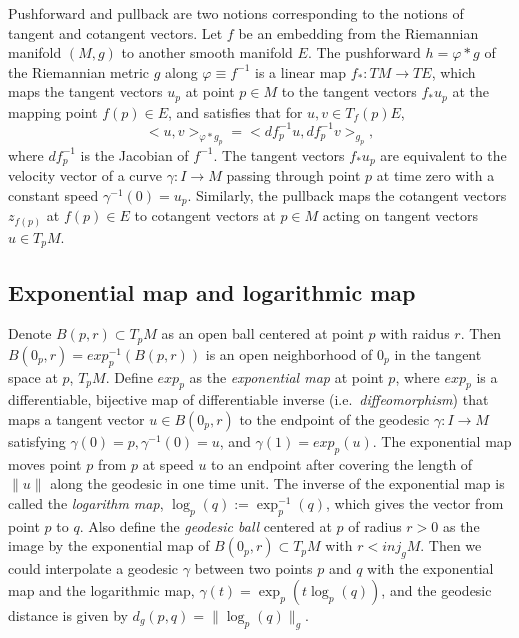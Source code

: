\documentclass[11pt,a4paper,]{article}
\begin{document}
Pushforward and pullback are two notions corresponding to the notions of tangent and cotangent vectors.
Let \(f\) be an embedding from the Riemannian manifold \((M,g)\) to another smooth manifold \(E\). The pushforward \(h=\varphi*g\) of the Riemannian metric \(g\) along \(\varphi \equiv f^{-1}\) is a linear map \(f_*:TM \rightarrow TE\), which maps the tangent vectors \(u_p\) at point \(p \in M\) to the tangent vectors \(f_*u_p\) at the mapping point \(f(p) \in E\), and satisfies that for \(u, v \in T_f(p)E\),
\[
<u,v>_{\varphi*g_p} = <df_p^{-1}u, df_p^{-1}v>_{g_p},
\]
where \(df_p^{-1}\) is the Jacobian of \(f^{-1}\).
The tangent vectors \(f_*u_p\) are equivalent to the velocity vector of a curve \(\gamma: I\rightarrow M\) passing through point \(p\) at time zero with a constant speed \(\gamma^{-1}(0)=u_p\).
Similarly, the pullback maps the cotangent vectors \(z_{f(p)}\) at \(f(p) \in E\) to cotangent vectors at \(p \in M\) acting on tangent vectors \(u \in T_pM\).

\hypertarget{exponential-map-and-logarithmic-map}{%
\subsection{Exponential map and logarithmic map}\label{exponential-map-and-logarithmic-map}}

Denote \(B(p, r) \subset T_pM\) as an open ball centered at point \(p\) with raidus \(r\). Then \(B(0_p, r) = exp_p^{-1}(B(p,r))\) is an open neighborhood of \(0_p\) in the tangent space at \(p\), \(T_pM\).
Define \(exp_p\) as the \emph{exponential map} at point \(p\), where \(exp_p\) is a differentiable, bijective map of differentiable inverse (i.e.~\emph{diffeomorphism}) that maps a tangent vector \(u \in B(0_p, r)\) to the endpoint of the geodesic \(\gamma: I \rightarrow M\) satisfying \(\gamma(0)=p, \gamma^{-1}(0)=u\), and \(\gamma(1)=exp_p(u)\).
The exponential map moves point \(p\) from \(p\) at speed \(u\) to an endpoint after covering the length of \(\|u\|\) along the geodesic in one time unit.
The inverse of the exponential map is called the \emph{logarithm map}, \(\log_p(q):= \exp^{-1}_p(q)\), which gives the vector from point \(p\) to \(q\).
Also define the \emph{geodesic ball} centered at \(p\) of radius \(r > 0\) as the image by the exponential map of \(B(0_p, r) \subset T_pM\) with \(r < \textit{inj}_gM\).
Then we could interpolate a geodesic \(\gamma\) between two points \(p\) and \(q\) with the exponential map and the logarithmic map, \(\gamma(t) = \exp_p(t\log_p(q))\), and the geodesic distance is given by \(d_g(p,q) = \|\log_p(q)\|_g\).
\end{document}

